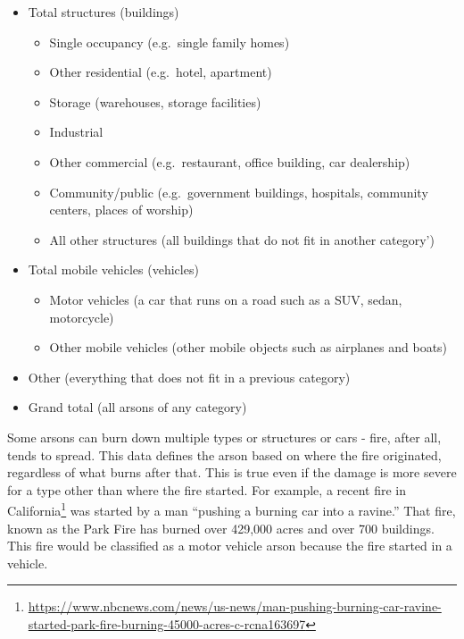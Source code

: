 \documentclass[
]{krantz}
\providecommand{\tightlist}{%
  \setlength{\itemsep}{0pt}\setlength{\parskip}{0pt}}
\renewcommand{\href}[2]{#2\footnote{\url{#1}}}
\begin{document}
\begin{itemize}
\tightlist
\item
  Total structures (buildings)

  \begin{itemize}
  \tightlist
  \item
    Single occupancy (e.g.~single family homes)
  \item
    Other residential (e.g.~hotel, apartment)
  \item
    Storage (warehouses, storage facilities)
  \item
    Industrial
  \item
    Other commercial (e.g.~restaurant, office building, car
    dealership)
  \item
    Community/public (e.g.~government buildings, hospitals,
    community centers, places of worship)
  \item
    All other structures (all buildings that do not fit in
    another category')
  \end{itemize}
\item
  Total mobile vehicles (vehicles)

  \begin{itemize}
  \tightlist
  \item
    Motor vehicles (a car that runs on a road such as a SUV,
    sedan, motorcycle)
  \item
    Other mobile vehicles (other mobile objects such as
    airplanes and boats)
  \end{itemize}
\item
  Other (everything that does not fit in a previous
  category)
\item
  Grand total (all arsons of any category)
\end{itemize}

Some arsons can burn down multiple types or structures or
cars - fire, after all, tends to spread. This data defines
the arson based on where the fire originated, regardless of
what burns after that. This is true even if the damage is
more severe for a type other than where the fire started.
For example, a
\href{https://www.nbcnews.com/news/us-news/man-pushing-burning-car-ravine-started-park-fire-burning-45000-acres-c-rcna163697}{recent
fire in California} was started by a man ``pushing a burning
car into a ravine.'' That fire, known as the Park Fire has
burned over 429,000 acres and over 700 buildings. This fire
would be classified as a motor vehicle arson because the
fire started in a vehicle.
\end{document}
